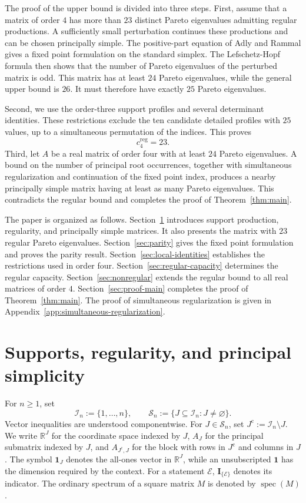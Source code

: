 \documentclass[11pt,a4paper]{article}
\theoremstyle{definition}
\newcommand{\R}{\mathbb R}
\newcommand{\Ind}{\mathcal I}
\newcommand{\Supp}{\mathscr S}
\newcommand{\one}{\mathbf 1}
\newcommand{\indic}{\mathbf I}
\begin{document}
The proof of the upper bound is divided into three steps. First, assume that a matrix of order $4$ has more than $23$ distinct Pareto eigenvalues admitting regular productions. A sufficiently small perturbation continues these productions and can be chosen principally simple. The positive-part equation of Adly and Rammal \cite{AdlyRammal2013} gives a fixed point formulation on the standard simplex. The Lefschetz-Hopf formula then shows that the number of Pareto eigenvalues of the perturbed matrix is odd. This matrix has at least $24$ Pareto eigenvalues, while the general upper bound is $26$. It must therefore have exactly $25$ Pareto eigenvalues.

Second, we use the order-three support profiles and several determinant identities. These restrictions exclude the ten candidate detailed profiles with $25$ values, up to a simultaneous permutation of the indices. This proves
$$
c_4^{\mathrm{reg}}=23.
$$
Third, let $A$ be a real matrix of order four with at least $24$ Pareto eigenvalues. A bound on the number of principal root occurrences, together with simultaneous regularization and continuation of the fixed point index, produces a nearby principally simple matrix having at least as many Pareto eigenvalues. This contradicts the regular bound and completes the proof of Theorem~\ref{thm:main}.

The paper is organized as follows. Section~\ref{sec:supports} introduces support production, regularity, and principally simple matrices. It also presents the matrix with $23$ regular Pareto eigenvalues. Section~\ref{sec:parity} gives the fixed point formulation and proves the parity result. Section~\ref{sec:local-identities} establishes the restrictions used in order four. Section~\ref{sec:regular-capacity} determines the regular capacity. Section~\ref{sec:nonregular} extends the regular bound to all real matrices of order $4$. Section~\ref{sec:proof-main} completes the proof of Theorem~\ref{thm:main}. The proof of simultaneous regularization is given in Appendix~\ref{app:simultaneous-regularization}.

\section{Supports, regularity, and principal simplicity}
\label{sec:supports}

For $n\geq1$, set
$$
\Ind_n:=\{1,\ldots,n\},
\qquad
\Supp_n:=\{J\subseteq\Ind_n:J\neq\varnothing\}.
$$
Vector inequalities are understood componentwise. For
$J\in\Supp_n$, set $J^{\mathrm c}:=\Ind_n\setminus J$. We write
$\R^J$ for the coordinate space indexed by $J$, $A_J$ for the
principal submatrix indexed by $J$, and $A_{J^{\mathrm c},J}$ for the
block with rows in $J^{\mathrm c}$ and columns in $J$. The symbol
$\one_J$ denotes the all-ones vector in $\R^J$, while an unsubscripted
$\one$ has the dimension required by the context. For a statement
$\mathcal E$, $\indic_{\{\mathcal E\}}$ denotes its indicator. The
ordinary spectrum of a square matrix $M$ is denoted by
$\operatorname{spec}(M)$.
\end{document}
